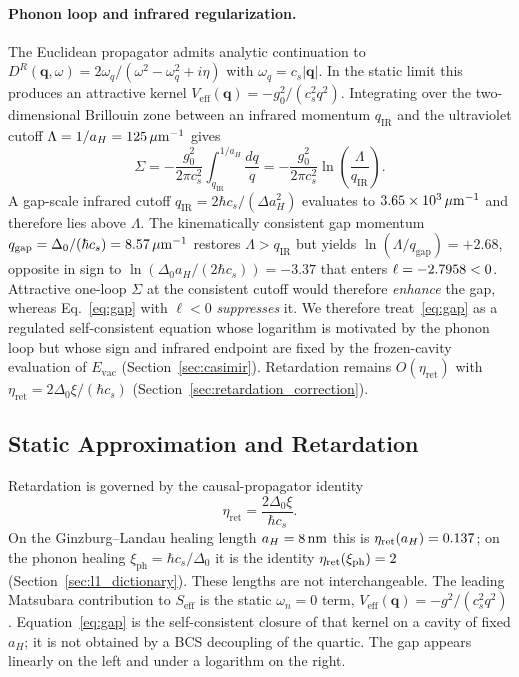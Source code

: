 \documentclass[11pt,letterpaper]{article}
\begin{document}
\paragraph{Phonon loop and infrared regularization.}
The Euclidean propagator admits analytic continuation to $D^R(\mathbf{q},\omega)=2\omega_q/(\omega^2-\omega_q^2+i\eta)$ with $\omega_q=c_s|\mathbf{q}|$. In the static limit this produces an attractive kernel $V_{\mathrm{eff}}(\mathbf{q})=-g_0^2/(c_s^2 q^2)$. Integrating over the two-dimensional Brillouin zone between an infrared momentum $q_{\mathrm{IR}}$ and the ultraviolet cutoff $\Lambda=1/a_H=125\,\mu\mathrm{m}^{-1}$ gives
\begin{equation}
\Sigma = -\frac{g_0^2}{2\pi c_s^2}\int_{q_{\mathrm{IR}}}^{1/a_H}\frac{dq}{q}
      = -\frac{g_0^2}{2\pi c_s^2}\ln\!\left(\frac{\Lambda}{q_{\mathrm{IR}}}\right).
\label{eq:selfenergy_sketch}
\end{equation}
A gap-scale infrared cutoff $q_{\mathrm{IR}}=2\hbar c_s/(\Delta a_H^2)$ evaluates to $3.65\times 10^{3}\,\mu\mathrm{m}^{-1}$ and therefore lies above $\Lambda$. The kinematically consistent gap momentum $q_{\mathrm{gap}}=\Delta_0/(\hbar c_s)=8.57\,\mu\mathrm{m}^{-1}$ restores $\Lambda>q_{\mathrm{IR}}$ but yields $\ln(\Lambda/q_{\mathrm{gap}})=+2.68$, opposite in sign to $\ln(\Delta_0 a_H/(2\hbar c_s))=-3.37$ that enters $\ell=-2.7958<0$. Attractive one-loop $\Sigma$ at the consistent cutoff would therefore \emph{enhance} the gap, whereas Eq.~\eqref{eq:gap} with $\ell<0$ \emph{suppresses} it. We therefore treat~\eqref{eq:gap} as a regulated self-consistent equation whose logarithm is motivated by the phonon loop but whose sign and infrared endpoint are fixed by the frozen-cavity evaluation of $E_{\mathrm{vac}}$ (Section~\ref{sec:casimir}). Retardation remains $O(\eta_{\mathrm{ret}})$ with $\eta_{\mathrm{ret}}=2\Delta_0\xi/(\hbar c_s)$ (Section~\ref{sec:retardation_correction}).

\subsection{Static Approximation and Retardation}

Retardation is governed by the causal-propagator identity
\begin{equation}
\eta_{\text{ret}} = \frac{2\Delta_0\xi}{\hbar c_s}.
\end{equation}
On the Ginzburg--Landau healing length $a_H=8\,\mathrm{nm}$ this is $\eta_{\mathrm{ret}}(a_H)=0.137$; on the phonon healing $\xi_{\mathrm{ph}}=\hbar c_s/\Delta_0$ it is the identity $\eta_{\mathrm{ret}}(\xi_{\mathrm{ph}})=2$ (Section~\ref{sec:l1_dictionary}). These lengths are not interchangeable. The leading Matsubara contribution to $S_{\text{eff}}$ is the static $\omega_n=0$ term, $V_{\text{eff}}(\mathbf{q})=-g^2/(c_s^2 q^2)$. Equation~\eqref{eq:gap} is the self-consistent closure of that kernel on a cavity of fixed $a_H$; it is not obtained by a BCS decoupling of the quartic. The gap appears linearly on the left and under a logarithm on the right.
\end{document}
